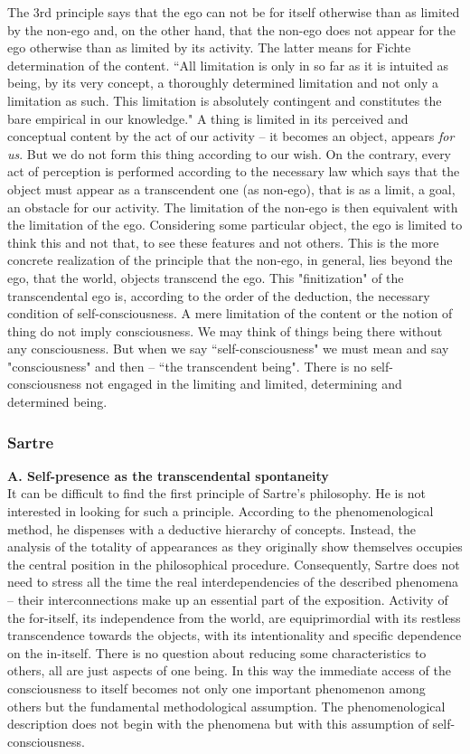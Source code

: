 The 3rd principle says that the ego can not be for itself otherwise than as limited by the non-ego and, on the 
other hand, that the non-ego does not appear for the ego otherwise than as limited by its activity. The latter means 
for Fichte determination of the content. ``All limitation is only in so far as it is intuited as being, by its very concept, 
a thoroughly determined limitation and not only a limitation as such. This limitation is absolutely contingent 
and constitutes the bare empirical in our knowledge." \cite{ITS} A thing is limited in its perceived and conceptual content 
by the act of our activity -- it becomes an object, appears {\em for us}. But we do not form this thing according to our 
wish. On the contrary, every act of perception is performed according to the necessary law which says that the 
object must appear as a transcendent one (as non-ego), that is as a limit, a goal, an obstacle for our activity. The 
limitation of the non-ego is then equivalent with the limitation of the ego. Considering some particular object, the 
ego is limited to think this and not that, to see these features and not others. This is the more concrete realization 
of the principle that the non-ego, in general, lies beyond the ego, that the world, objects transcend the ego. This 
"finitization" of the transcendental ego is, according to the order of the deduction, the necessary condition of self-consciousness. A mere limitation of the content or the notion of thing do not imply consciousness. We may think of 
things being there without any consciousness. But when we say ``self-consciousness" we must mean and say 
"consciousness" and then -- ``the transcendent being". There is no self-consciousness 
not engaged in the limiting and limited, determining and determined being.

\subsubsection{Sartre}\label{transcSartre}

{\bf A. Self-presence as the transcendental spontaneity} \\
It can be difficult to find the first principle of Sartre's philosophy. He is not interested in looking for such a 
principle. According to the phenomenological method, he dispenses with a deductive hierarchy of concepts. Instead, 
the analysis of the totality of appearances as they originally show themselves occupies the central position in the 
philosophical procedure. Consequently, Sartre does not need to stress all the time the real interdependencies of the 
described phenomena -- their interconnections make up an essential part of the exposition. Activity of the for-itself, 
its independence from the world, are equiprimordial with its restless transcendence towards the objects, with its 
intentionality and specific dependence on the in-itself. There is no question about reducing some characteristics to 
others, all are just aspects of one being. In this way the immediate access of the consciousness to itself becomes 
not only one important phenomenon among others but the fundamental methodological assumption. The 
phenomenological description does not begin with the phenomena but with this assumption of self-consciousness.

